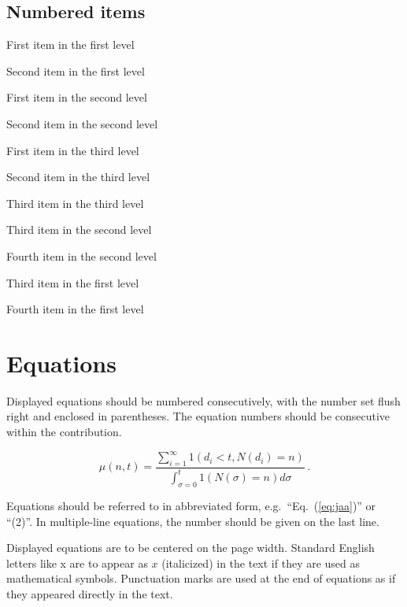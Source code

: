\documentclass{ws-ijprai}
\begin{document}
\subsection*{Numbered items}

\begin{arabiclist}
\item First item in the first level
\item Second item in the first level
\begin{alphlist}[(a)]
\item First item in the second level
\item Second item in the second level
\begin{romanlist}[iii.]
\item First item in the third level
\item Second item in the third level
\item Third item in the third level
\end{romanlist}
\item Third item in the second level
\item Fourth item in the second level
\end{alphlist}
\item Third item in the first level
\item Fourth item in the first level
\end{arabiclist}

\section{Equations}

Displayed equations should be numbered consecutively, with the number
set flush right and enclosed in parentheses. The equation numbers
should be consecutive within the contribution.

\begin{equation}
\mu(n, t) = \frac{\sum^\infty_{i=1} 1(d_i < t, N(d_i)
= n)}{\int^t_{\sigma=0} 1(N(\sigma) = n)d\sigma}\,.
\label{eq:jaa}
\end{equation}

Equations should be referred to in abbreviated form,
e.g.~``Eq.~(\ref{eq:jaa})'' or ``(2)''. In multiple-line equations,
the number should be given on the last line.

Displayed equations are to be centered on the page width.  Standard
English letters like x are to appear as $x$ (italicized) in the text
if they are used as mathematical symbols. Punctuation marks are used
at the end of equations as if they appeared directly in the text.
\end{document}
